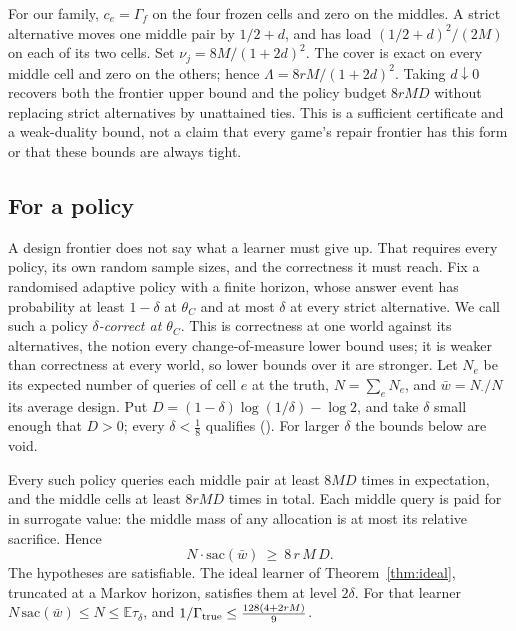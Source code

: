 For our family, $c_e=\Gamma_f$ on the four frozen cells and zero on the middles. A strict
alternative moves one middle pair by $1/2+d$, and has load $(1/2+d)^2/(2M)$ on each of its
two cells. Set $\nu_j=8M/(1+2d)^2$. The cover is exact on every middle cell and zero on the
others; hence $\Lambda=8rM/(1+2d)^2$. Taking $d\downarrow0$ recovers both the frontier upper
bound and the policy budget $8rMD$ without replacing strict alternatives by unattained ties.
This is a sufficient certificate and a weak-duality bound, not a claim that every game's
repair frontier has this form or that these bounds are always tight.

\subsection{For a policy}

A design frontier does not say what a learner must give up. That requires every policy, its
own random sample sizes, and the correctness it must reach. Fix a randomised adaptive policy
with a finite horizon, whose answer event has probability at least $1-\delta$ at $\theta_{C}$
and at most $\delta$ at every strict alternative. We call such a policy \emph{$\delta$-correct at
$\theta_C$}. This is correctness at one world against its alternatives, the notion every
change-of-measure lower bound uses; it is weaker than correctness at every world, so lower bounds
over it are stronger. Let $N_{e}$ be its expected number of queries
of cell $e$ at the truth, $N=\sum_{e}N_{e}$, and $\bar w=N_{\cdot}/N$ its average design. Put
$D=(1-\delta)\log(1/\delta)-\log2$, and take $\delta$ small enough that $D>0$; every
$\delta<\frac18$ qualifies (). For larger $\delta$ the bounds below are void.

\begin{theorem}
\label{thm:sacrifice}
Every such policy queries each middle pair at least $8MD$ times in expectation, and the middle
cells at least $8rMD$ times in total. Each middle query is paid for in surrogate value: the
middle mass of any allocation is at most its relative sacrifice. Hence
\[
N\cdot\mathrm{sac}(\bar w)\ \ge\ 8\,r\,M\,D .
\]
The hypotheses are satisfiable. The ideal learner of Theorem~\ref{thm:ideal}, truncated at a
Markov horizon, satisfies them at level $2\delta$. For that learner
$N\,\mathrm{sac}(\bar w)\le N\le\mathbb{E}\tau_{\delta}$, and
$1/\Gamma_{\rm true}\le\frac{128(4+2rM)}{9}$.
\end{theorem}

